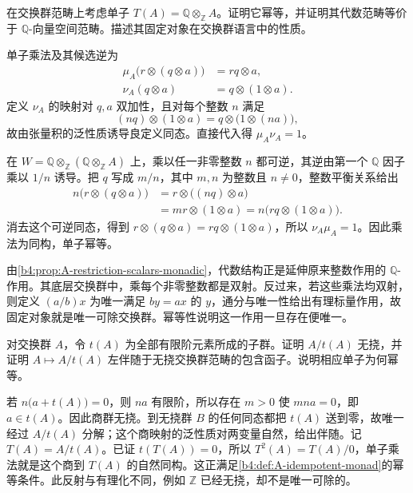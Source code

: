 \begin{exercise}\label{b4:ex:A-rationalization}
	在交换群范畴上考虑单子 \(T(A)=\mathbb Q\otimes_{\mathbb Z}A\)。证明它幂等，并证明其代数范畴等价于 \(\mathbb Q\)-向量空间范畴。描述其固定对象在交换群语言中的性质。
\end{exercise}
\begin{solution}
	单子乘法及其候选逆为
	\[
		\begin{aligned}
			\mu_A\bigl(r\otimes(q\otimes a)\bigr)&=rq\otimes a,\\
			\nu_A(q\otimes a)&=q\otimes(1\otimes a).
		\end{aligned}
	\]
	定义 \(\nu_A\) 的映射对 \(q,a\) 双加性，且对每个整数 \(n\) 满足
	\[
		(nq)\otimes(1\otimes a) =q\otimes\bigl(1\otimes(na)\bigr),
	\]
	故由张量积的泛性质诱导良定义同态。直接代入得 \(\mu_A\nu_A=1\)。

	在 \(W=\mathbb Q\otimes_{\mathbb Z}(\mathbb Q\otimes_{\mathbb Z}A)\) 上，乘以任一非零整数 \(n\) 都可逆，其逆由第一个 \(\mathbb Q\) 因子乘以 \(1/n\) 诱导。把 \(q\) 写成 \(m/n\)，其中 \(m,n\) 为整数且 \(n\ne0\)，整数平衡关系给出
	\[
		\begin{aligned}
			n\bigl(r\otimes(q\otimes a)\bigr) &=r\otimes\bigl((nq)\otimes a\bigr)\\
			&=mr\otimes(1\otimes a) =n\bigl(rq\otimes(1\otimes a)\bigr).
		\end{aligned}
	\]
	消去这个可逆同态，得到 \(r\otimes(q\otimes a)=rq\otimes(1\otimes a)\)，所以 \(\nu_A\mu_A=1\)。因此乘法为同构，单子幂等。

	由\cref{b4:prop:A-restriction-scalars-monadic}，代数结构正是延伸原来整数作用的 \(\mathbb Q\)-作用。其底层交换群中，乘每个非零整数都是双射。反过来，若这些乘法均双射，则定义 \((a/b)x\) 为唯一满足 \(by=ax\) 的 \(y\)，通分与唯一性给出有理标量作用，故固定对象就是唯一可除交换群。幂等性说明这一作用一旦存在便唯一。
\end{solution}

\begin{exercise}\label{b4:ex:A-torsionfree-reflection}
	对交换群 \(A\)，令 \(t(A)\) 为全部有限阶元素所成的子群。证明 \(A/t(A)\) 无挠，并证明 \(A\mapsto A/t(A)\) 左伴随于无挠交换群范畴的包含函子。说明相应单子为何幂等。
\end{exercise}
\begin{solution}
	若 \(n\bigl(a+t(A)\bigr)=0\)，则 \(na\) 有限阶，所以存在 \(m>0\) 使 \(mna=0\)，即 \(a\in t(A)\)。因此商群无挠。到无挠群 \(B\) 的任何同态都把 \(t(A)\) 送到零，故唯一经过 \(A/t(A)\) 分解；这个商映射的泛性质对两变量自然，给出伴随。记 \(T(A)=A/t(A)\)。已证 \(t(T(A))=0\)，所以 \(T^2(A)=T(A)/0\)，单子乘法就是这个商到 \(T(A)\) 的自然同构。这正满足\cref{b4:def:A-idempotent-monad}的幂等条件。此反射与有理化不同，例如 \(\mathbb Z\) 已经无挠，却不是唯一可除的。
\end{solution}

